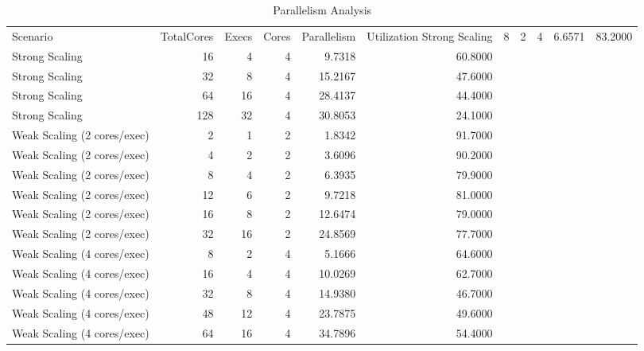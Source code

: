 \begin{table}
\caption{Parallelism Analysis}
\label{tab:table7_parallelism}
\begin{tabular}{lrrrrr}
\toprule
Scenario & TotalCores & Execs & Cores & Parallelism & Utilization%
\midrule
Strong Scaling & 8 & 2 & 4 & 6.6571 & 83.2000 \\
Strong Scaling & 16 & 4 & 4 & 9.7318 & 60.8000 \\
Strong Scaling & 32 & 8 & 4 & 15.2167 & 47.6000 \\
Strong Scaling & 64 & 16 & 4 & 28.4137 & 44.4000 \\
Strong Scaling & 128 & 32 & 4 & 30.8053 & 24.1000 \\
Weak Scaling (2 cores/exec) & 2 & 1 & 2 & 1.8342 & 91.7000 \\
Weak Scaling (2 cores/exec) & 4 & 2 & 2 & 3.6096 & 90.2000 \\
Weak Scaling (2 cores/exec) & 8 & 4 & 2 & 6.3935 & 79.9000 \\
Weak Scaling (2 cores/exec) & 12 & 6 & 2 & 9.7218 & 81.0000 \\
Weak Scaling (2 cores/exec) & 16 & 8 & 2 & 12.6474 & 79.0000 \\
Weak Scaling (2 cores/exec) & 32 & 16 & 2 & 24.8569 & 77.7000 \\
Weak Scaling (4 cores/exec) & 8 & 2 & 4 & 5.1666 & 64.6000 \\
Weak Scaling (4 cores/exec) & 16 & 4 & 4 & 10.0269 & 62.7000 \\
Weak Scaling (4 cores/exec) & 32 & 8 & 4 & 14.9380 & 46.7000 \\
Weak Scaling (4 cores/exec) & 48 & 12 & 4 & 23.7875 & 49.6000 \\
Weak Scaling (4 cores/exec) & 64 & 16 & 4 & 34.7896 & 54.4000 \\
\bottomrule
\end{tabular}
\end{table}

